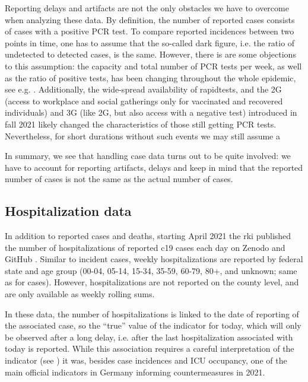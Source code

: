 Reporting delays and artifacts are not the only obstacles we have to overcome when analyzing these data. By definition, the number of reported cases consists of cases with a positive PCR test. To compare reported incidences between two points in time, one has to assume that the so-called dark figure, i.e. the ratio of undetected to detected cases, is the same. However, there is are some objections to this assumption: the capacity and total number of PCR tests per week, as well as the ratio of positive tests, has been changing throughout the whole epidemic, see e.g. \citep{Willrich2021Update}. Additionally, the wide-spread availability of rapidtests, and the 2G (access to workplace and social gatherings only for vaccinated and recovered individuals) and 3G (like 2G, but also access with a negative test)  introduced in fall 2021 likely changed the characteristics of those still getting PCR tests. Nevertheless, for short durations without such events we may still assume a 

In summary, we see that handling case data turns out to be quite involved: we have to account for reporting artifacts, delays and keep in mind that the reported number of cases is not the same as the actual number of cases. 

\subsection{Hospitalization data}
\label{subsec:hospitalization_data}
In addition to reported cases and deaths, starting  April 2021 the \acrshort{rki} published the number of hospitalizations of reported \acrshort{c19} cases each day on Zenodo \citep{RobertKoch-Institut2024COVID19Hospitalisierungen} and GitHub \citep{RobertKoch-Institut2024COVID19Hospitalisierungena}. 
Similar to incident cases, weekly hospitalizations are reported by federal state and age group (00-04, 05-14, 15-34, 35-59, 60-79, 80+, and unknown; same as for cases). However, hospitalizations are not reported on the county level, and are only available as weekly rolling sums.

In these data, the number of hospitalizations is linked to the date of reporting of the associated case, so the ``true'' value of the indicator for today, which will only be observed after a long delay, i.e. after the last hospitalization associated with today is reported. While this association requires a careful interpretation of the indicator (see ) it was, besides case incidences and ICU occupancy, one of the main official indicators in Germany informing countermeasures in 2021.

